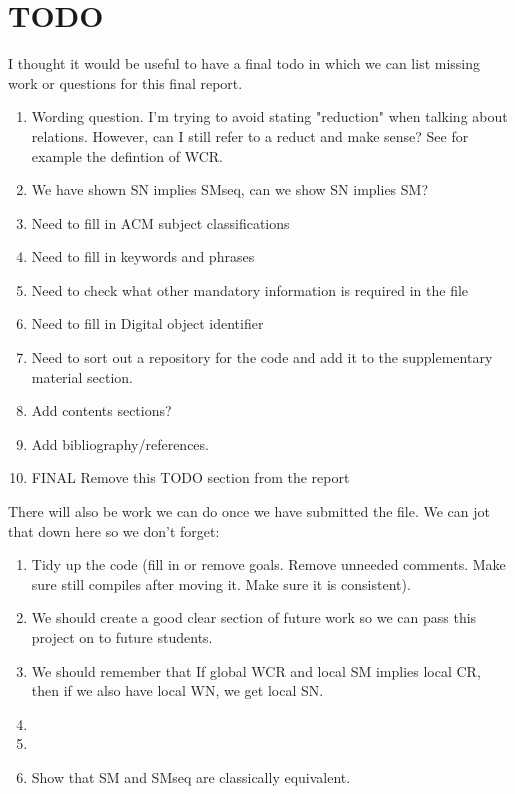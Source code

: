 \section{TODO}

I thought it would be useful to have a final todo in which we can list missing work or questions for this final report.

\begin{enumerate}
    \item Wording question. I'm trying to avoid stating "reduction" when talking about relations. However, can I still refer to a reduct and make sense? See for example the defintion of WCR.
    \item We have shown SN implies SMseq, can we show SN implies SM?
    \item Need to fill in ACM subject classifications
    \item Need to fill in keywords and phrases
    \item Need to check what other mandatory information is required in the file 
    \item Need to fill in Digital object identifier 
    \item Need to sort out a repository for the code and add it to the supplementary material section.  
    \item Add contents sections?
    \item Add bibliography/references.
    \item FINAL Remove this TODO section from the report 
\end{enumerate}

There will also be work we can do once we have submitted the file. We can jot that down here so we don't forget:

\begin{enumerate}
    \item Tidy up the code (fill in or remove goals. Remove unneeded comments. Make sure still compiles after moving it. Make sure it is consistent).
    \item We should create a good clear section of future work so we can pass this project on to future students.
    \item {We should remember that If global WCR and local SM implies local CR, then if we also have local WN, we get local SN.}
    \item {}
    \item {}
    \item Show that SM and SMseq are classically equivalent.
\end{enumerate}